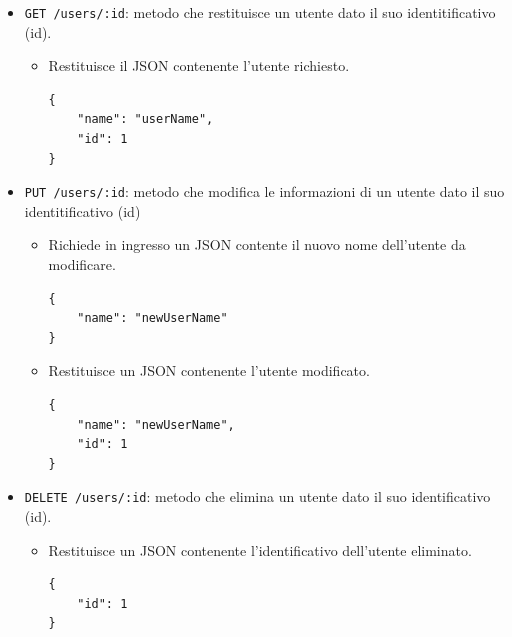 \documentclass[a4paper]{article}
\begin{document}
\begin{itemize}
\begin{itemize}
\begin{verbatim}
    ...
]
        \end{verbatim}
    \end{itemize}
    \item \texttt{GET /users/:id}: metodo che restituisce un utente dato il suo identitificativo (id).
    \begin{itemize}
        \item Restituisce il JSON contenente l'utente richiesto.
        \begin{verbatim}
{
    "name": "userName",
    "id": 1
}
        \end{verbatim}
    \end{itemize}
    \item \texttt{PUT /users/:id}: metodo che modifica le informazioni di un utente dato il suo identitificativo (id)
    \begin{itemize}
        \item Richiede in ingresso un JSON contente il nuovo nome dell'utente da modificare.
        \begin{verbatim}
{
    "name": "newUserName"
}
        \end{verbatim}
        \item Restituisce un JSON contenente l'utente modificato.
        \begin{verbatim}
{
    "name": "newUserName",
    "id": 1
}
        \end{verbatim}
    \end{itemize}
    \item \texttt{DELETE /users/:id}: metodo che elimina un utente dato il suo identificativo (id).
    \begin{itemize}
        \item Restituisce un JSON contenente l'identificativo dell'utente eliminato.
        \begin{verbatim}
{
    "id": 1
}
        \end{verbatim}
    \end{itemize}
\end{itemize}
\end{document}
